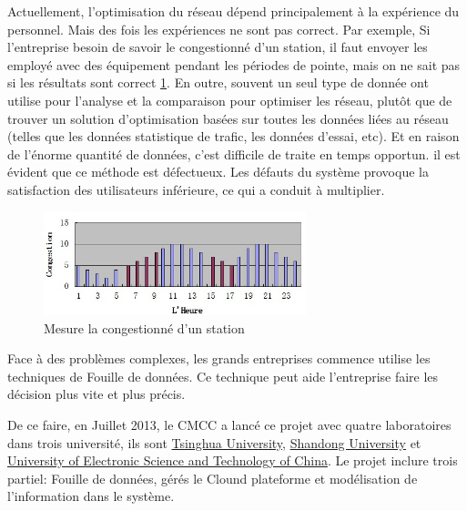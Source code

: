 Actuellement, l'optimisation du réseau dépend principalement à la expérience du personnel. Mais des fois les expériences ne sont pas correct. Par exemple, Si l'entreprise besoin de savoir le congestionné d'un station, il faut envoyer les employé avec des équipement pendant les périodes de pointe, mais on ne sait pas si les résultats sont correct \ref{meseau}.  En outre, souvent un seul type de  donnée ont utilise pour l'analyse et la comparaison pour optimiser les réseau, plutôt que de trouver un solution d'optimisation basées sur toutes les données liées au réseau (telles que les données statistique de trafic, les données d'essai, etc). Et en raison de l'énorme quantité de données, c'est difficile de traite en temps opportun. il est évident que ce méthode est défectueux. Les défauts du système provoque la satisfaction des utilisateurs inférieure, ce qui a conduit à multiplier.
      \begin{figure}[H]
          \centering
          \includegraphics[width=3in]{images/meseau.jpg}
          \caption{Mesure la congestionné d'un station}
          \label{meseau}
      \end{figure}
      
Face à des problèmes complexes, les grands entreprises commence utilise les techniques de Fouille de données. Ce technique peut aide l'entreprise faire les décision plus vite et plus précis.

De ce faire, en Juillet 2013, le CMCC a lancé ce projet avec quatre laboratoires dans trois université, ils sont
 \href{http://www.tsinghua.edu.cn/publish/newthuen/index.html}{Tsinghua University}, \href{http://en.sdu.edu.cn/}{Shandong University} et \href{http://www.oice.uestc.edu.cn/en/}{University of Electronic Science and Technology of China}. Le projet inclure trois partiel: Fouille de données, gérés le Clound plateforme et modélisation de l'information dans le système.
 

